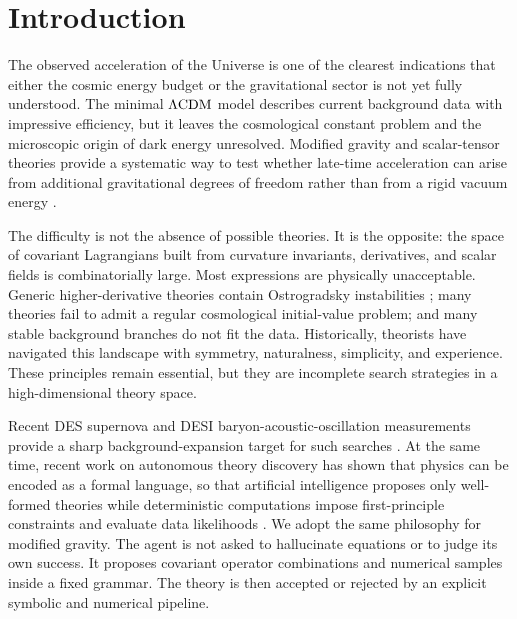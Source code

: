\documentclass[aps,prd,twocolumn,superscriptaddress,nofootinbib,longbibliography]{revtex4-2}
\newcommand{\LCDM}{\Lambda{\rm CDM}}
\begin{document}
\section{Introduction}
\label{sec:introduction}

The observed acceleration of the Universe is one of the clearest indications that either the cosmic energy budget or the gravitational sector is not yet fully understood.  The minimal $\LCDM$ model describes current background data with impressive efficiency, but it leaves the cosmological constant problem and the microscopic origin of dark energy unresolved.  Modified gravity and scalar-tensor theories provide a systematic way to test whether late-time acceleration can arise from additional gravitational degrees of freedom rather than from a rigid vacuum energy \cite{Clifton2012,SotiriouFaraoni2010,Horndeski1974}.

The difficulty is not the absence of possible theories.  It is the opposite: the space of covariant Lagrangians built from curvature invariants, derivatives, and scalar fields is combinatorially large.  Most expressions are physically unacceptable.  Generic higher-derivative theories contain Ostrogradsky instabilities \cite{Ostrogradsky1850}; many theories fail to admit a regular cosmological initial-value problem; and many stable background branches do not fit the data.  Historically, theorists have navigated this landscape with symmetry, naturalness, simplicity, and experience.  These principles remain essential, but they are incomplete search strategies in a high-dimensional theory space.

Recent DES supernova and DESI baryon-acoustic-oscillation measurements provide a sharp background-expansion target for such searches \cite{DES2024SN,DESI2025BAO}.  At the same time, recent work on autonomous theory discovery has shown that physics can be encoded as a formal language, so that artificial intelligence proposes only well-formed theories while deterministic computations impose first-principle constraints and evaluate data likelihoods \cite{Alexander2026Albert}.  We adopt the same philosophy for modified gravity.  The agent is not asked to hallucinate equations or to judge its own success.  It proposes covariant operator combinations and numerical samples inside a fixed grammar.  The theory is then accepted or rejected by an explicit symbolic and numerical pipeline.
\end{document}
